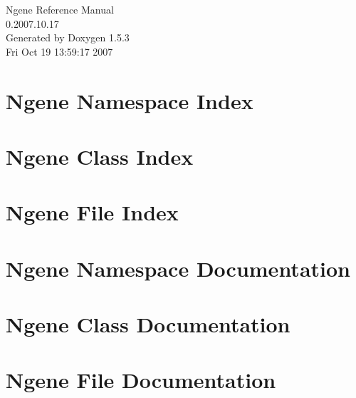 \documentclass[a4paper]{book}
\begin{document}
\begin{titlepage}
\vspace*{7cm}
\begin{center}
{\Large Ngene Reference Manual\\[1ex]\large 0.2007.10.17 }\\
\vspace*{1cm}
{\large Generated by Doxygen 1.5.3}\\
\vspace*{0.5cm}
{\small Fri Oct 19 13:59:17 2007}\\
\end{center}
\end{titlepage}
\clearemptydoublepage
{}
\tableofcontents
\clearemptydoublepage
{}
\chapter{Ngene Namespace Index}

\chapter{Ngene Class Index}

\chapter{Ngene File Index}

\chapter{Ngene Namespace Documentation}

\chapter{Ngene Class Documentation}





\chapter{Ngene File Documentation}















\printindex
\end{document}
